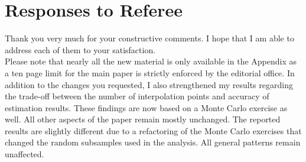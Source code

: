 \newpage\section*{Responses to Referee}\vspace{1.0cm}
Thank you very much for your constructive comments. I hope that I am able to address each of them to your satisfaction.\\\newline
%
Please note that nearly all the new material is only available in the Appendix as a ten page limit for the main paper is strictly enforced by the editorial office. In addition to the changes you requested, I also strengthened my results regarding the trade-off between the number of interpolation points and accuracy of estimation results. These findings are now based on a Monte Carlo exercise as well. All other aspects of the paper remain mostly unchanged. The reported results are slightly different due to a refactoring of the Monte Carlo exercises that changed the random subsamples used in the analysis. All general patterns remain unaffected.
